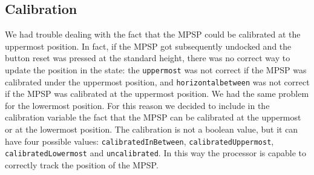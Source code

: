 \subsection{Calibration}

We had trouble dealing with the fact that the MPSP could be calibrated at the uppermost position.
In fact, if the MPSP got subsequently undocked and the button reset was pressed at the standard height, there was no correct way to update the position in the state: the \texttt{uppermost} was not correct if the MPSP was calibrated under the uppermost position, and \texttt{horizontalbetween} was not correct if the MPSP was calibrated at the uppermost position.
We had the same problem for the lowermost position.
For this reason we decided to include in the calibration variable the fact that the MPSP can be calibrated at the uppermost or at the lowermost position.
The calibration is not a boolean value, but it can have four possible values:
\texttt{calibratedInBetween},
\texttt{calibratedUppermost},
\texttt{calibratedLowermost} and
\texttt{uncalibrated}.
In this way the processor is capable to correctly track the position of the MPSP.
